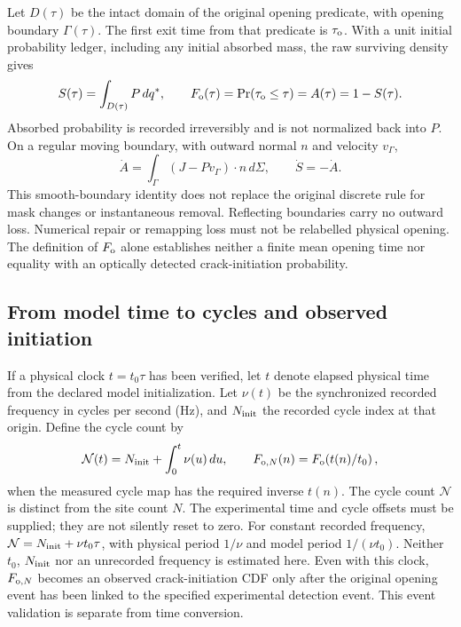 \documentclass[11pt]{article}
\begin{document}
Let $D(\tau)$ be the intact domain of the original opening predicate, with
opening boundary $\Gamma(\tau)$. The first exit time from that predicate is
$\tau_{\rm o}$. With a unit initial probability ledger, including any initial
absorbed mass, the raw surviving density gives
\begin{equation}
 S(\tau)=\int_{D(\tau)}P\,dq^*,\qquad
 F_{\rm o}(\tau)=\Pr(\tau_{\rm o}\leq\tau)=A(\tau)=1-S(\tau).
\end{equation}
Absorbed probability is recorded irreversibly and is not normalized back into $P$.
On a regular moving boundary, with outward normal $n$ and velocity $v_\Gamma$,
\begin{equation}
 \dot A=\int_\Gamma (J-Pv_\Gamma)\cdot n\,d\Sigma,\qquad \dot S=-\dot A.
\end{equation}
This smooth-boundary identity does not replace the original discrete rule for
mask changes or instantaneous removal. Reflecting boundaries carry no outward
loss. Numerical repair or remapping loss must not be relabelled physical opening.
The definition of $F_{\rm o}$ alone establishes neither a finite mean opening
time nor equality with an optically detected crack-initiation probability.

\subsection{From model time to cycles and observed initiation}
If a physical clock $t=t_0\tau$ has been verified, let $t$ denote elapsed
physical time from the declared model initialization. Let $\nu(t)$ be the
synchronized recorded frequency in cycles per second (Hz), and $N_{\rm init}$
the recorded cycle index at that origin. Define the cycle count by
\begin{equation}
 \mathcal N(t)=N_{\rm init}+\int_0^t\nu(u)\,du,\qquad
 F_{{\rm o},N}(n)=F_{\rm o}\!\left(t(n)/t_0\right),
\end{equation}
when the measured cycle map has the required inverse $t(n)$.
The cycle count $\mathcal N$ is distinct from the site count $N$.
The experimental time and cycle offsets must be supplied; they are not
silently reset to zero. For constant recorded frequency,
$\mathcal N=N_{\rm init}+\nu t_0\tau$, with physical period $1/\nu$
and model period $1/(\nu t_0)$. Neither $t_0$, $N_{\rm init}$ nor an
unrecorded frequency is estimated here.
Even with this clock, $F_{{\rm o},N}$ becomes an observed crack-initiation CDF
only after the original opening event has been linked to the specified
experimental detection event. This event validation is separate from time conversion.
\end{document}
